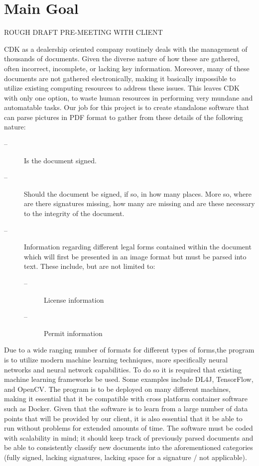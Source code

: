 \documentclass[onecolumn, draftclsnofoot,10pt, compsoc]{IEEEtran}
\begin{document}
\newpage
{}
\tableofcontents
\clearpage

\section{Main Goal}
	ROUGH DRAFT PRE-MEETING WITH CLIENT
	
	CDK as a dealership oriented company routinely deals with the management of thousands of documents. Given the diverse nature of how these are gathered,  often incorrect, incomplete, or lacking key information. Moreover, many of these documents are not gathered electronically, making it basically impossible to utilize existing computing resources to address these issues. This leaves CDK with only one option, to waste human resources in performing very mundane and automatable tasks. Our job for this project is to create standalone software that can parse pictures in PDF format to gather from these details of the following nature:
\begin{description}
	\item[--]Is the document signed.
	\item[--]Should the document be signed, if so, in how many places. More so, where are there signatures missing, how many are missing and are these necessary to the integrity of the document.
	\item[--]Information regarding different legal forms contained within the document which will first be presented in an image format but must be parsed into text. These include, but are not limited to:
	\begin{description}
		\item[--]License information
		\item[--]Permit information 
	\end{description}
\end{description}

Due to a wide ranging number of formats for different types of forms,the program is to utilize modern machine learning techniques, more specifically neural networks and neural network capabilities. To do so it is required that existing machine learning frameworks be used. Some examples include DL4J, TensorFlow, and OpenCV. The program is to be deployed on many different machines, making it essential that it be compatible with cross platform container software such as Docker. Given that the software is to learn from a large number of data points that will be provided by our client, it is also essential that it be able to run without problems for extended amounts of time. The software must be coded with scalability in mind; it should keep track of previously parsed documents and be able to consistently classify new documents into the aforementioned categories (fully signed, lacking signatures, lacking space for a signature / not applicable). 
\end{document}
